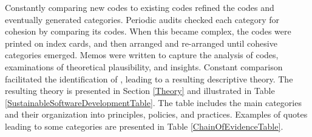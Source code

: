

Constantly comparing new codes to existing codes refined the codes and eventually generated categories. Periodic audits checked each category for cohesion by comparing its codes. When this became complex, the codes were printed on index cards, and then arranged and re-arranged until cohesive categories emerged. Memos were written to capture the analysis of codes, examinations of theoretical plausibility, and insights. 
Constant comparison facilitated the identification of  \cite{GlaserBasics}, leading to a resulting descriptive theory. The resulting theory is presented in Section \ref{Theory} and illustrated in Table \ref{SustainableSoftwareDevelopmentTable}. The table includes the main categories and their organization into principles, policies, and practices. Examples of quotes leading to some categories are presented in Table \ref{ChainOfEvidenceTable}.

